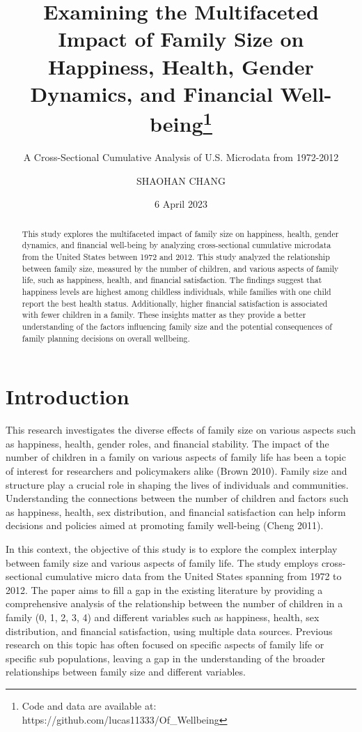 \documentclass[
  letterpaper,
  DIV=11,
  numbers=noendperiod]{scrartcl}
\title{Examining the Multifaceted Impact of Family Size on Happiness,
Health, Gender Dynamics, and Financial Well-being\thanks{Code and data
are available at: https://github.com/lucas11333/Of\_Wellbeing}}
\subtitle{A Cross-Sectional Cumulative Analysis of U.S. Microdata from
1972-2012}
\author{SHAOHAN CHANG}
\date{6 April 2023}
\begin{document}
\maketitle
\begin{abstract}
This study explores the multifaceted impact of family size on happiness,
health, gender dynamics, and financial well-being by analyzing
cross-sectional cumulative microdata from the United States between 1972
and 2012. This study analyzed the relationship between family size,
measured by the number of children, and various aspects of family life,
such as happiness, health, and financial satisfaction. The findings
suggest that happiness levels are highest among childless individuals,
while families with one child report the best health status.
Additionally, higher financial satisfaction is associated with fewer
children in a family. These insights matter as they provide a better
understanding of the factors influencing family size and the potential
consequences of family planning decisions on overall wellbeing.
\end{abstract}
\ifdefined\Shaded\renewenvironment{Shaded}{\begin{tcolorbox}[interior hidden, borderline west={3pt}{0pt}{shadecolor}, enhanced, breakable, frame hidden, boxrule=0pt, sharp corners]}{\end{tcolorbox}}\fi

\hypertarget{introduction}{%
\section{Introduction}\label{introduction}}

This research investigates the diverse effects of family size on various
aspects such as happiness, health, gender roles, and financial
stability. The impact of the number of children in a family on various
aspects of family life has been a topic of interest for researchers and
policymakers alike (Brown 2010). Family size and structure play a
crucial role in shaping the lives of individuals and communities.
Understanding the connections between the number of children and factors
such as happiness, health, sex distribution, and financial satisfaction
can help inform decisions and policies aimed at promoting family
well-being (Cheng 2011).

In this context, the objective of this study is to explore the complex
interplay between family size and various aspects of family life. The
study employs cross-sectional cumulative micro data from the United
States spanning from 1972 to 2012. The paper aims to fill a gap in the
existing literature by providing a comprehensive analysis of the
relationship between the number of children in a family (0, 1, 2, 3, 4)
and different variables such as happiness, health, sex distribution, and
financial satisfaction, using multiple data sources. Previous research
on this topic has often focused on specific aspects of family life or
specific sub populations, leaving a gap in the understanding of the
broader relationships between family size and different variables.
\end{document}
